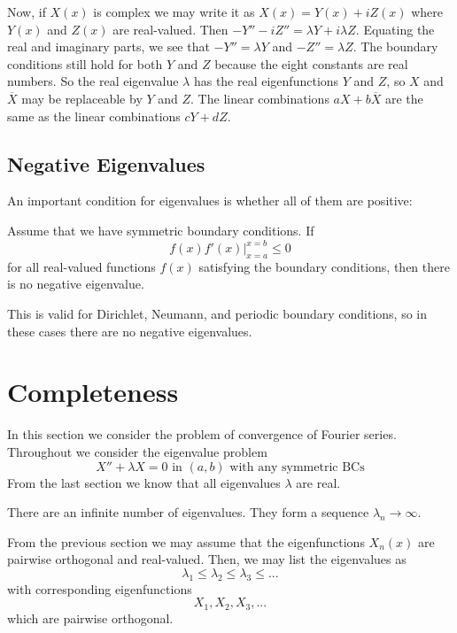 Now, if $X(x)$ is complex we may write it as $X(x) = Y(x) + iZ(x)$ where $Y(x)$ and $Z(x)$ are real-valued. Then $-Y''-iZ'' = \lambda Y+i\lambda Z$. Equating the real and imaginary parts, we see that $-Y'' = \lambda Y$ and $-Z'' = \lambda Z$. The boundary conditions still hold for both $Y$ and $Z$ because the eight constants are real numbers. So the real eigenvalue $\lambda$ has the real eigenfunctions $Y$ and $Z$, so $X$ and $\overline{X}$ may be replaceable by $Y$ and $Z$. The linear combinations $aX+b\overline{X}$ are the same as the linear combinations $cY+dZ$.

\subsection{Negative Eigenvalues}

An important condition for eigenvalues is whether all of them are positive:
 
\begin{theorem}
    Assume that we have symmetric boundary conditions. If \begin{equation*}
        f(x)f'(x)\Bigg\rvert_{x=a}^{x=b}\leq 0
    \end{equation*}
    for all real-valued functions $f(x)$ satisfying the boundary conditions, then there is no negative eigenvalue.
\end{theorem}

This is valid for Dirichlet, Neumann, and periodic boundary conditions, so in these cases there are no negative eigenvalues.



\section{Completeness}

In this section we consider the problem of convergence of Fourier series. Throughout we consider the eigenvalue problem \begin{equation*}
    X'' + \lambda X=0\text{ in } (a,b)\text{ with any symmetric BCs}
\end{equation*}
From the last section we know that all eigenvalues $\lambda$ are real.

\begin{theorem}
    There are an infinite number of eigenvalues. They form a sequence $\lambda_n\rightarrow \infty$.
\end{theorem}
From the previous section we may assume that the eigenfunctions $X_n(x)$ are pairwise orthogonal and real-valued. Then, we may list the eigenvalues as $$\lambda_1\leq\lambda_2\leq\lambda_3\leq ...$$ with corresponding eigenfunctions $$X_1,X_2,X_3,...$$ which are pairwise orthogonal.


